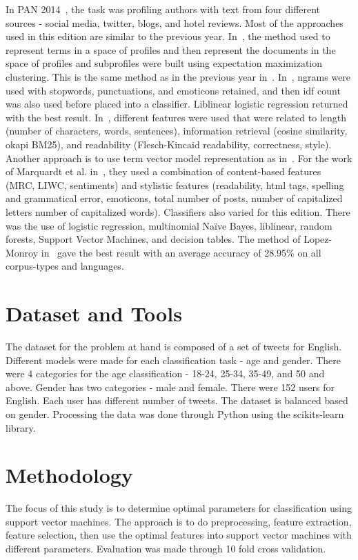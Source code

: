 \documentclass[a4paper]{llncs}
\begin{document}
In PAN 2014~\cite{rangel2014overview}, the task was profiling authors with text from four different sources - social media, twitter, blogs, and hotel reviews. Most of the approaches used in this edition are similar to the previous year. In~\cite{lopezusing}, the method used to represent terms in a space of profiles and then represent the documents in the space of profiles and subprofiles were built using expectation maximization clustering. This is the same method as in the previous year in~\cite{lopez2013inaoe}. In~\cite{maharjansimple}, ngrams were used with stopwords, punctuations, and emoticons retained, and then idf count was also used before placed into a classifier. Liblinear logistic regression returned with the best result. In~\cite{weren6exploring}, different features were used that were related to length (number of characters, words, sentences), information retrieval (cosine similarity, okapi BM25), and readability (Flesch-Kincaid readability, correctness, style). Another approach is to use term vector model representation as in~\cite{villenadaedalus}. For the work of Marquardt et al. in~\cite{marquardt2014age}, they used a combination of content-based features (MRC, LIWC, sentiments) and stylistic features (readability, html tags, spelling and grammatical error, emoticons, total number of posts, number of capitalized letters number of capitalized words). Classifiers also varied for this edition. There was the use of logistic regression, multinomial Naïve Bayes, liblinear, random forests, Support Vector Machines, and decision tables. The method of Lopez-Monroy in~\cite{lopezusing} gave the best result with an average accuracy of 28.95\% on all corpus-types and languages. 

\section{Dataset and Tools}
The dataset for the problem at hand is composed of a set of tweets for English. Different models were made for each classification task - age and gender. There were 4 categories for the age classification - 18-24, 25-34, 35-49, and 50 and above. Gender has two categories - male and female. There were 152 users for English. Each user has different number of tweets. The dataset is balanced based on gender. Processing the data was done through Python using the scikits-learn~\cite{scikit-learn} library. 

\section{Methodology}
The focus of this study is to determine optimal parameters for classification using support vector machines. The approach is to do preprocessing, feature extraction, feature selection, then use the optimal features into support vector machines with different parameters. Evaluation was made through 10 fold cross validation.
\end{document}
